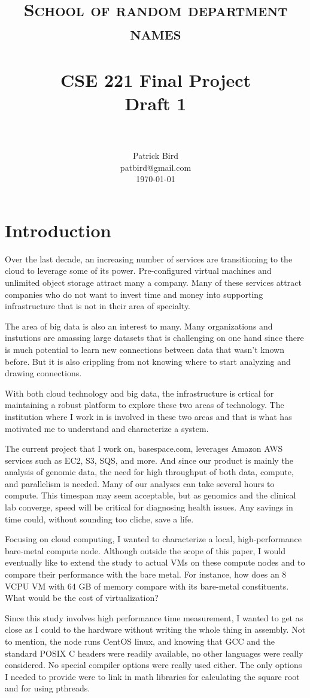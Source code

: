 \documentclass[paper=a4, fontsize=11pt]{scrartcl}
\title{
		\usefont{OT1}{bch}{b}{n}
		\normalfont \normalsize \textsc{School of random department names} \\ [25pt]
		\horrule{0.5pt} \\[0.4cm]
		\huge CSE 221 Final Project \\
        \huge       Draft 1         \\
		\horrule{2pt} \\[0.5cm]
}
\author{
		\normalfont 								\normalsize
        Patrick Bird\\[-3pt]		\normalsize
        patbird@gmail.com\\           \normalsize
        \today
}
\date{}
\numberwithin{equation}{section}		%
\numberwithin{figure}{section}			%
\numberwithin{table}{section}				%
\begin{document}
\maketitle
\section{Introduction}
Over the last decade, an increasing number of services are transitioning to the cloud to leverage some of its power.  Pre-configured virtual machines and unlimited object storage attract many a company.  Many of these services attract companies who do not want to invest time and money into supporting infrastructure that is not in their area of specialty.

The area of big data is also an interest to many.  Many organizations and instutions are amassing large datasets that is challenging on one hand since there is much potential to learn new connections between data that wasn't known before.  But it is also crippling from not knowing where to start analyzing and drawing connections.

With both cloud technology and big data, the infrastructure is crtical for maintaining a robust platform to explore these two areas of technology.  The institution where I work in is involved in these two areas and that is what has motivated me to understand and characterize a system.

The current project that I work on, basespace.com, leverages Amazon AWS services such as EC2, S3, SQS, and more.  And since our product is mainly the analysis of genomic data, the need for high throughput of both data, compute, and parallelism is needed.  Many of our analyses can take several hours to compute.  This timespan may seem acceptable, but as genomics and the clinical lab converge, speed will be critical for diagnosing health issues.  Any savings in time could, without sounding too cliche, save a life.

Focusing on cloud computing, I wanted to characterize a local, high-performance bare-metal compute node.  Although outside the scope of this paper, I would eventually like to extend the study to actual VMs on these compute nodes and to compare their performance with the bare metal.  For instance, how does an 8 VCPU VM with 64 GB of memory compare with its bare-metal constituents.  What would be the cost of virtualization?

Since this study involves high performance time measurement, I wanted to get as close as I could to the hardware without writing the whole thing in assembly.  Not to mention, the node runs CentOS linux, and knowing that GCC and the standard POSIX C headers were readily available, no other languages were really considered.  No special compiler options were really used either.  The only options I needed to provide were to link in math libraries for calculating the square root and for using pthreads.
\end{document}
